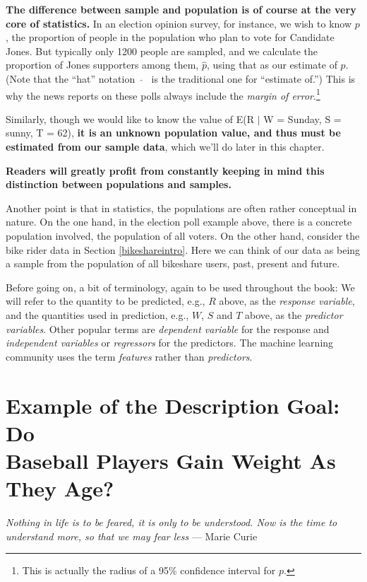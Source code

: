 {\bf The difference between sample and population is of course at the
very core of statistics.}  In an election opinion survey, for instance,
we wish to know $p$, the proportion of people in the population who plan
to vote for Candidate Jones.  But typically only 1200 people are
sampled, and we calculate the proportion of Jones supporters among them,
$\widehat{p}$, using that as our estimate of $p$.  (Note that the
``hat'' notation \ $\widehat{}$ \ is the traditional one for ``estimate
of.'') This is why the news reports on these polls always include the
{\it margin of error}.\footnote{This is actually the radius of a 95\%
confidence interval for $p$.}

Similarly, though we would like to know the value of E(R $|$ W =
Sunday, S = sunny, T = 62), {\bf it is an unknown
population value, and thus must be estimated from our sample data}, which
we'll do later in this chapter.

{\bf Readers will greatly profit from constantly keeping in mind this
distinction between populations and samples.}

Another point is that in statistics, the populations are often 
rather conceptual in nature.  On the one hand, in the election poll
example above, there is a concrete population involved, the population
of all voters.  On the other hand, consider the bike rider data in
Section \ref{bikeshareintro}.  Here we can think of our data as being a
sample from the population of all bikeshare users, past, present and
future.

Before going on, a bit of terminology, again to be used throughout the
book:  We will refer to the quantity to be predicted, e.g., $R$ above,
as the {\it response variable}, and the quantities used in prediction,
e.g., $W$, $S$ and $T$ above, as the {\it predictor variables}.  Other
popular terms are {\it dependent variable} for the response and {\it
independent variables} or {\it regressors} for the predictors.
The machine learning community uses the term {\it features} rather
than {\it predictors}.

\section{Example of the Description Goal:  Do \\ Baseball Players Gain 
Weight As They Age?} 
\label{baseball}

{\it Nothing in life is to be feared, it is only to be understood. Now
is the time to understand more, so that we may fear less} --- Marie
Curie


